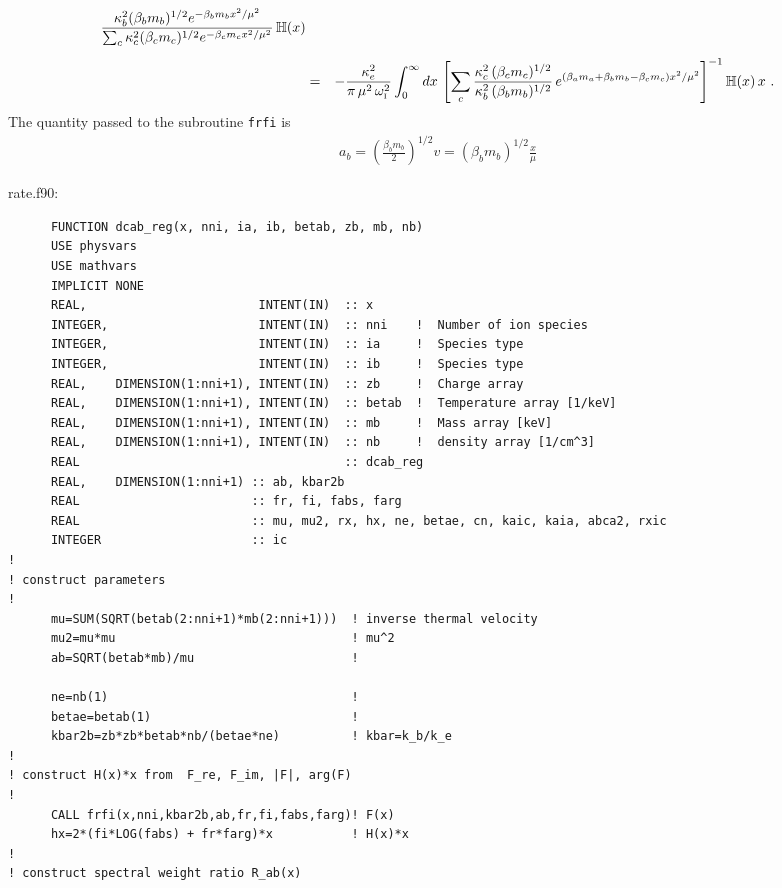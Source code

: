\documentclass[preprint,12pt,eqsecnum,nofootinbib,amsmath,amssymb]{revtex4}
\newcommand{\smI}{{\rm\scriptscriptstyle I}}
\begin{document}
{{{{{\begin{eqnarray}
  \frac{\kappa_b^2 (\beta_b m_b)^{1/2}e^{-\beta_b m_b x^2/\mu^2}}
  {\sum_c\kappa_c^2 (\beta_c m_c)^{1/2}e^{-\beta_c m_c x^2/\mu^2}}\,
  \mathbb{H}(x)
\\[5pt]
  &=&
  -\frac{\kappa_e^2}{\pi\,\mu^2\,\omega_\smI^2}\int_0^{\infty}  dx \,
  \left[
  \sum_c \frac{\kappa_c^2\, (\beta_c m_c)^{1/2}}{\kappa_b^2\, (\beta_b
  m_b)^{1/2}} \, 
  e^{(\beta_a m_a + \beta_b m_b-\beta_c m_c )x^2/\mu^2}
  \right]^{-1}
  \mathbb{H}(x)\, x \ .
\end{eqnarray}
The quantity passed to the subroutine \verb+frfi+ is
\begin{eqnarray}
  a_b = \left( \frac{\beta_b m_b}{2}\right)^{1/2} \! v
      = \left(\beta_b m_b\right)^{1/2} \frac{x}{\mu}
\end{eqnarray}



\vskip0.4cm 
\noindent
rate.f90:
{
\baselineskip 10pt
\begin{verbatim}
      FUNCTION dcab_reg(x, nni, ia, ib, betab, zb, mb, nb)
      USE physvars
      USE mathvars
      IMPLICIT NONE
      REAL,                        INTENT(IN)  :: x
      INTEGER,                     INTENT(IN)  :: nni    !  Number of ion species
      INTEGER,                     INTENT(IN)  :: ia     !  Species type
      INTEGER,                     INTENT(IN)  :: ib     !  Species type
      REAL,    DIMENSION(1:nni+1), INTENT(IN)  :: zb     !  Charge array
      REAL,    DIMENSION(1:nni+1), INTENT(IN)  :: betab  !  Temperature array [1/keV]
      REAL,    DIMENSION(1:nni+1), INTENT(IN)  :: mb     !  Mass array [keV]
      REAL,    DIMENSION(1:nni+1), INTENT(IN)  :: nb     !  density array [1/cm^3]
      REAL                                     :: dcab_reg
      REAL,    DIMENSION(1:nni+1) :: ab, kbar2b
      REAL                        :: fr, fi, fabs, farg
      REAL                        :: mu, mu2, rx, hx, ne, betae, cn, kaic, kaia, abca2, rxic
      INTEGER                     :: ic
!
! construct parameters
!
      mu=SUM(SQRT(betab(2:nni+1)*mb(2:nni+1)))  ! inverse thermal velocity
      mu2=mu*mu                                 ! mu^2
      ab=SQRT(betab*mb)/mu                      !

      ne=nb(1)                                  !
      betae=betab(1)                            !
      kbar2b=zb*zb*betab*nb/(betae*ne)          ! kbar=k_b/k_e
!
! construct H(x)*x from  F_re, F_im, |F|, arg(F)
!
      CALL frfi(x,nni,kbar2b,ab,fr,fi,fabs,farg)! F(x) 
      hx=2*(fi*LOG(fabs) + fr*farg)*x           ! H(x)*x
!
! construct spectral weight ratio R_ab(x)


\end{verbatim}}}}}}}
\end{document}

